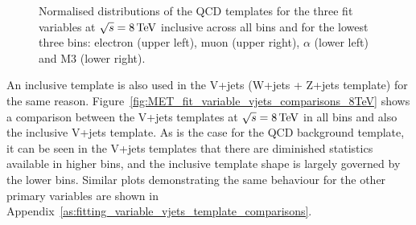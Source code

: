 \begin{figure}[hbtp]
	 \caption{Normalised distributions of the QCD templates for the three fit variables at $\sqrt{s}=8\,\text{Te\hspace{-.08em}V}$
	 inclusive across all \met bins and for the lowest three \met bins: electron \abseta (upper
	 left), muon \abseta (upper right), $\alpha$ (lower left) and M3 (lower right).}
     \label{fig:fit_variable_qcd_comparisons_8TeV}
\end{figure}

An inclusive template is also used in the V+jets (W+jets + Z+jets template) for the same reason.
Figure~\ref{fig:MET_fit_variable_vjets_comparisons_8TeV} shows a comparison between the V+jets templates at
$\sqrt{s}=8\,\text{Te\hspace{-.08em}V}$ in all \met bins and also the inclusive \met V+jets template.
As is the case for the QCD background template, it can be seen in the V+jets templates that there are
diminished statistics available in higher bins, and the inclusive template shape is largely governed by the
lower bins. Similar plots demonstrating the same behaviour for the other primary variables are shown in
Appendix~\ref{as:fitting_variable_vjets_template_comparisons}.


